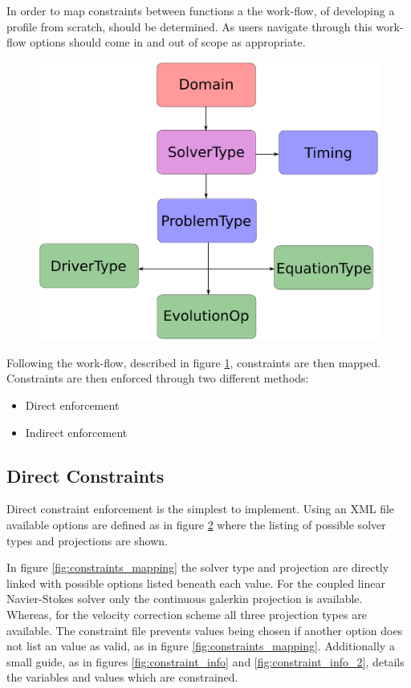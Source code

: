 \documentclass[11pt, a4paper]{report}
\begin{document}
In order to map constraints between functions a the work-flow, of developing a profile from scratch, should be determined. As users navigate through this work-flow options should come in and out of scope as appropriate.

\begin{figure}[htb!]
 \centering
 \includegraphics[width=.5\linewidth,  clip=true, trim = 0cm 0cm 0cm 0cm]{decision_flow}
 \label{fig:descision_flow}
\end{figure}

Following the work-flow, described in figure \ref{fig:descision_flow}, constraints are then mapped. Constraints are then enforced through two different methods:
\begin{itemize}
\item Direct enforcement
\item Indirect enforcement
\end{itemize}

\subsection{Direct Constraints}
Direct constraint enforcement is the simplest to implement. Using an XML file available options are defined as in figure \ref{fig:constraints_variables} where the listing of possible solver types and projections are shown.

\begin{figure}[htb!]
 \centering
 
 \label{fig:constraints_variables}
\end{figure}

In figure \ref{fig:constraints_mapping} the solver type and projection are directly linked with possible options listed beneath each value. For the coupled linear Navier-Stokes solver only the continuous galerkin projection is available. Whereas, for the velocity correction scheme all three projection types are available. The constraint file prevents values being chosen if another option does not list an value as valid, as in figure \ref{fig:constraints_mapping}. Additionally a small guide, as in figures \ref{fig:constraint_info} and \ref{fig:constraint_info_2}, details the variables and values which are constrained.
\end{document}
